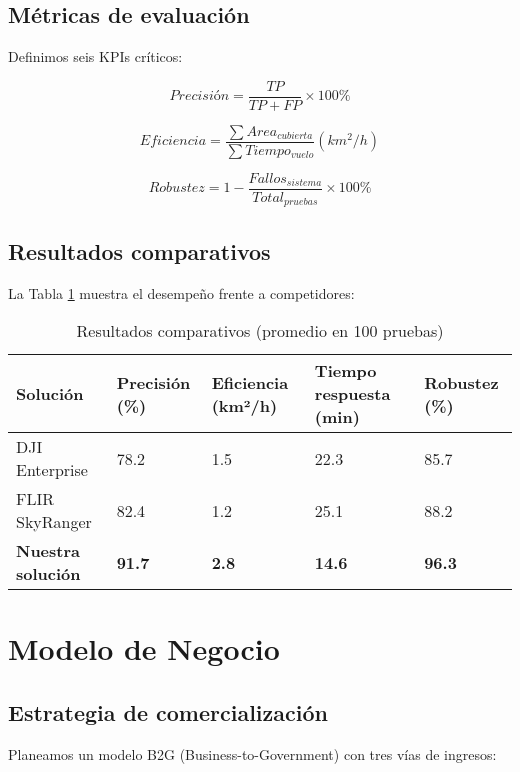 \documentclass[journal]{new-aiaa}
\begin{document}
\subsection{Métricas de evaluación}
Definimos seis KPIs críticos:

\begin{equation}
Precisión = \frac{TP}{TP + FP} \times 100\%
\end{equation}

\begin{equation}
Eficiencia = \frac{\sum Area_{cubierta}}{\sum Tiempo_{vuelo}} (km^2/h)
\end{equation}

\begin{equation}
Robustez = 1 - \frac{Fallos_{sistema}}{Total_{pruebas}} \times 100\%
\end{equation}

\subsection{Resultados comparativos}
La Tabla \ref{tab:resultados} muestra el desempeño frente a competidores:

\begin{table}[h]
\centering
\caption{Resultados comparativos (promedio en 100 pruebas)}
\label{tab:resultados}
\begin{tabularx}{\textwidth}{|l|X|X|X|X|}
\hline
\textbf{Solución} & \textbf{Precisión (\%)} & \textbf{Eficiencia (km²/h)} & \textbf{Tiempo respuesta (min)} & \textbf{Robustez (\%)} \\
\hline
DJI Enterprise & 78.2 & 1.5 & 22.3 & 85.7 \\
\hline
FLIR SkyRanger & 82.4 & 1.2 & 25.1 & 88.2 \\
\hline
\textbf{Nuestra solución} & \textbf{91.7} & \textbf{2.8} & \textbf{14.6} & \textbf{96.3} \\
\hline
\end{tabularx}
\end{table}

\section{Modelo de Negocio}
\subsection{Estrategia de comercialización}
Planeamos un modelo B2G (Business-to-Government) con tres vías de ingresos:
\end{document}

